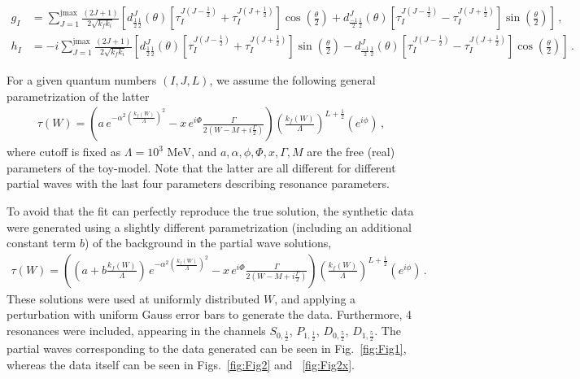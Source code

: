 \documentclass[aps, prd, twocolumn, showpacs, superscriptaddress,
preprintnumbers, nofootinbib]{revtex4-1}
\begin{document}
\begin{widetext}

\begin{align}
g_I&=\sum_{J=1}^{\text{jmax}} \frac{(2J+1)}{2 \sqrt{k_f  k_i}} \left[d^J_{\frac{1}{2} \frac{1}{2}}(\theta)[\tau^{J(J-\frac{1}{2})}_I+\tau^{J(J+\frac{1}{2})}_I]\cos(\frac{\theta}{2})+ d^J_{\frac{-1}{2} \frac{1}{2}}(\theta)[\tau^{J(J-\frac{1}{2})}_I-\tau^{J(J+\frac{1}{2})}_I]\sin(\frac{\theta}{2})\right]\,,\\
h_I&=-i\sum_{J=1}^{\text{jmax}} \frac{(2J+1)}{2 \sqrt{k_f  k_i}} \left[d^J_{\frac{1}{2} \frac{1}{2}}(\theta)[\tau^{J(J-\frac{1}{2})}_I+\tau^{J(J+\frac{1}{2})}_I]\sin(\frac{\theta}{2})- d^J_{\frac{-1}{2} \frac{1}{2}}(\theta)[\tau^{J(J-\frac{1}{2})}_I-\tau^{J(J+\frac{1}{2})}_I]\cos(\frac{\theta}{2})\right]\,.
\end{align}


For a given quantum numbers $(I,J,L)$, we assume the following general parametrization of the latter
\begin{align}
\tau(W)= \left(a\,e^{-\alpha^2 (\frac{k_f(W)}{\Lambda})^2} -x\,e^{i\Phi} \frac{\Gamma}{2(W-M+i \frac{\Gamma}{2})} \right) \left(\frac{k_f(W)}{\Lambda} \right) ^{L+\frac{1}{2}} \left( e^{i \phi} \right)\,,
\end{align}
where cutoff is fixed as $\Lambda=10^3 \text{ MeV}$, and $a,\alpha, \phi,\Phi,x, \Gamma,M$ are the free (real) parameters of the toy-model. Note that 
the latter are all different for different partial waves with the last four parameters describing resonance parameters.  


To avoid that the fit can perfectly reproduce the true solution, the synthetic data were generated using a slightly different parametrization (including an additional constant term $b$) of the background in the partial wave solutions,
\begin{align}
\tau(W)= \left((a+b\frac{k_f(W)}{\Lambda})\,e^{-\alpha^2 (\frac{k_f(W)}{\Lambda})^2} -x\,e^{i\Phi} \frac{\Gamma}{2(W-M+i \frac{\Gamma}{2})} \right) \left(\frac{k_f(W)}{\Lambda} \right) ^{L+\frac{1}{2}} \left( e^{i \phi} \right)\,.
\end{align}
These solutions were used at uniformly distributed $W$, and applying a perturbation with uniform Gauss error bars to generate the data. Furthermore, 4 resonances were included, appearing in the channels $S_{0,\frac{1}{2}}$, $P_{1,\frac{1}{2}}$, $D_{0,\frac{5}{2}}$, $D_{1,\frac{5}{2}}$. The partial waves corresponding to the data generated can be seen in  Fig.~\ref{fig:Fig1}, whereas the data itself can be seen in Figs.~\ref{fig:Fig2} and ~\ref{fig:Fig2x}.

\end{widetext}




\end{document}
